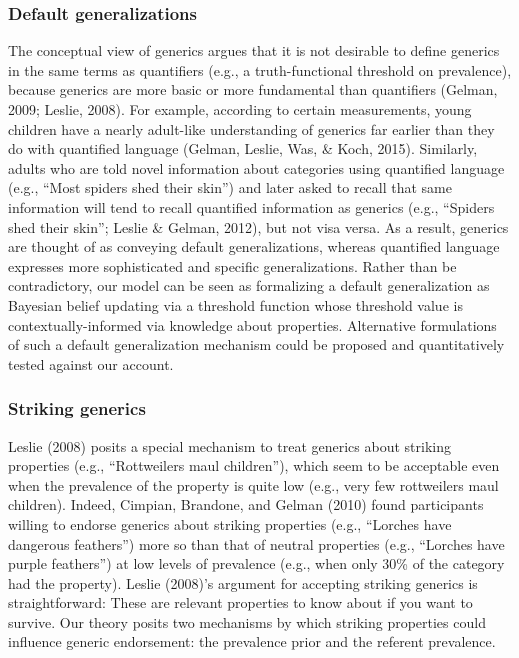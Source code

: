 \documentclass[english,,man,floatsintext]{apa6}
\theoremstyle{definition}
\theoremstyle{definition}
\theoremstyle{definition}
\theoremstyle{remark}
\begin{document}
\hypertarget{default-generalizations}{%
\subsubsection{Default generalizations}\label{default-generalizations}}

The conceptual view of generics argues that it is not desirable to
define generics in the same terms as quantifiers (e.g., a
truth-functional threshold on prevalence), because generics are more
basic or more fundamental than quantifiers (Gelman, 2009; Leslie, 2008).
For example, according to certain measurements, young children have a
nearly adult-like understanding of generics far earlier than they do
with quantified language (Gelman, Leslie, Was, \& Koch, 2015).
Similarly, adults who are told novel information about categories using
quantified language (e.g., \enquote{Most spiders shed their skin}) and
later asked to recall that same information will tend to recall
quantified information as generics (e.g., ``Spiders shed their skin'';
Leslie \& Gelman, 2012), but not visa versa. As a result, generics are
thought of as conveying default generalizations, whereas quantified
language expresses more sophisticated and specific generalizations.
Rather than be contradictory, our model can be seen as formalizing a
default generalization as Bayesian belief updating via a threshold
function whose threshold value is contextually-informed via knowledge
about properties. Alternative formulations of such a default
generalization mechanism could be proposed and quantitatively tested
against our account.

\hypertarget{striking-generics}{%
\subsubsection{Striking generics}\label{striking-generics}}

Leslie (2008) posits a special mechanism to treat generics about
striking properties (e.g., \enquote{Rottweilers maul children}), which
seem to be acceptable even when the prevalence of the property is quite
low (e.g., very few rottweilers maul children). Indeed, Cimpian,
Brandone, and Gelman (2010) found participants willing to endorse
generics about striking properties (e.g., \enquote{Lorches have
dangerous feathers}) more so than that of neutral properties (e.g.,
\enquote{Lorches have purple feathers}) at low levels of prevalence
(e.g., when only 30\% of the category had the property). Leslie (2008)'s
argument for accepting striking generics is straightforward: These are
relevant properties to know about if you want to survive. Our theory
posits two mechanisms by which striking properties could influence
generic endorsement: the prevalence prior and the referent prevalence.
\end{document}
